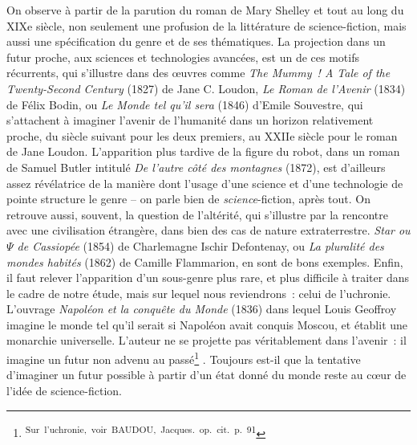 \documentclass[letterpaper,portrait,12pt]{article}
\begin{document}
	On observe \`{a} partir de la parution du roman de Mary Shelley et tout au long du XIXe si\`{e}cle, non seulement une profusion de la litt\'{e}rature de science-fiction, mais aussi une sp\'{e}cification du genre et de ses th\'{e}matiques. La projection dans un futur proche, aux sciences et technologies avanc\'{e}es, est un de ces motifs r\'{e}currents, qui s'illustre dans des \oe{}uvres comme \emph{The Mummy ! A Tale of the Twenty-Second Century} (1827) de Jane C. Loudon, \emph{Le Roman de l'Avenir} (1834) de F\'{e}lix Bodin, ou \emph{Le Monde tel qu'il sera} (1846) d'Emile Souvestre, qui s'attachent \`{a} imaginer l'avenir de l'humanit\'{e} dans un horizon relativement proche, du si\`{e}cle suivant pour les deux premiers, au XXIIe si\`{e}cle pour le roman de Jane Loudon. L'apparition plus tardive de la figure du robot, dans un roman de Samuel Butler intitul\'{e}\emph{ De l'autre c\^{o}t\'{e} des montagnes} (1872),\emph{ }est d'ailleurs assez r\'{e}v\'{e}latrice de la mani\`{e}re dont l'usage d'une science et d'une technologie de pointe structure le genre -- on parle bien de \emph{science}-fiction, apr\`{e}s tout. On retrouve aussi, souvent, la question de l'alt\'{e}rit\'{e}, qui s'illustre par la rencontre avec une civilisation \'{e}trang\`{e}re, dans bien des cas de nature extraterrestre. \emph{Star ou $\Psi$ de Cassiop\'{e}e} (1854) de Charlemagne Ischir Defontenay, ou \emph{La pluralit\'{e} des mondes habit\'{e}s} (1862) de Camille Flammarion, en sont de bons exemples. Enfin, il faut relever l'apparition d'un sous-genre plus rare, et plus difficile \`{a} traiter dans le cadre de notre \'{e}tude, mais sur lequel nous reviendrons : celui de l'uchronie. L'ouvrage \emph{Napol\'{e}on et la conqu\^{e}te du Monde} (1836) dans lequel Louis Geoffroy imagine le monde tel qu'il serait si Napol\'{e}on avait conquis Moscou, et \'{e}tablit une monarchie universelle. L'auteur ne se projette pas v\'{e}ritablement dans l'avenir : il imagine un futur non advenu au pass\'{e}\footnote{\textsuperscript{\newpage
}\textsuperscript{	Sur\ l'uchronie,\ voir\ BAUDOU,\ Jacques.\ op.\ cit.\ p.\ 91}} . Toujours est-il que la tentative d'imaginer un futur possible \`{a} partir d'un \'{e}tat donn\'{e} du monde reste au c\oe{}ur de l'id\'{e}e de science-fiction. 
\end{document}
